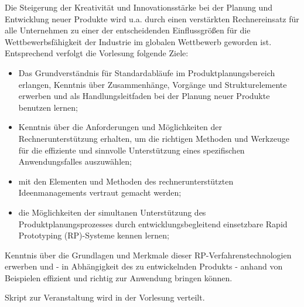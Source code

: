 \begin{course}
\begin{content}
Die Steigerung der Kreativität und Innovationsstärke bei der Planung und Entwicklung neuer Produkte wird u.a. durch einen verstärkten Rechnereinsatz für alle Unternehmen zu einer der entscheidenden Einflussgrößen für die Wettbewerbsfähigkeit der Industrie im globalen Wettbewerb geworden ist. \newline
\newline
 Entsprechend verfolgt die Vorlesung folgende Ziele:

 \begin{itemize}\item Das Grundverständnis für Standardabläufe im Produktplanungsbereich erlangen, Kenntnis über Zusammenhänge, Vorgänge und Strukturelemente erwerben und als Handlungsleitfaden bei der Planung neuer Produkte benutzen lernen;  \item Kenntnis über die Anforderungen und Möglichkeiten der Rechnerunterstützung erhalten, um die richtigen Methoden und Werkzeuge für die effiziente und sinnvolle Unterstützung eines spezifischen Anwendungsfalles auszuwählen;  \item mit den Elementen und Methoden des rechnerunterstützten Ideenmanagements vertraut gemacht werden;  \item die Möglichkeiten der simultanen Unterstützung des Produktplanungsprozesses durch entwicklungsbegleitend einsetzbare Rapid Prototyping (RP)-Systeme kennen lernen;  \end{itemize}

Kenntnis über die Grundlagen und Merkmale dieser RP-Verfahrenstechnologien erwerben und - in Abhängigkeit des zu entwickelnden Produkts - anhand von Beispielen effizient und richtig zur Anwendung bringen können.


\end{content}

\begin{media}Skript zur Veranstaltung wird in der Vorlesung verteilt.

\end{media}





\end{course}